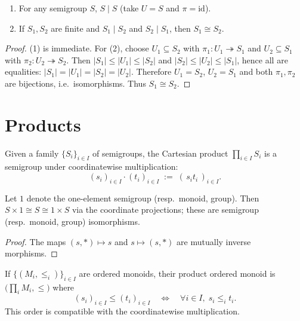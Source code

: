 \begin{lemma}
\label{lem:division-reflexive-antisymmetric-finite}
\leavevmode
\begin{enumerate}
\item For any semigroup \(S\), \(S\mid S\) (take \(U=S\) and \(\pi=\mathrm{id}\)).
\item If \(S_1,S_2\) are finite and \(S_1\mid S_2\) and \(S_2\mid S_1\), then \(S_1\cong S_2\).
\end{enumerate}
\end{lemma}
\begin{proof}
(1) is immediate. For (2), choose \(U_1\subseteq S_2\) with \(\pi_1:U_1\twoheadrightarrow S_1\) and \(U_2\subseteq S_1\) with \(\pi_2:U_2\twoheadrightarrow S_2\). Then
\(|S_1|\le |U_1|\le |S_2|\) and \(|S_2|\le |U_2|\le |S_1|\), hence all are equalities:
\(|S_1|=|U_1|=|S_2|=|U_2|\). Therefore \(U_1=S_2\), \(U_2=S_1\) and both \(\pi_1,\pi_2\) are bijections, i.e.\ isomorphisms. Thus \(S_1\cong S_2\).
\end{proof}


\section {Products}

\begin{definition}
\label{def:semigroup-product}
Given a family \(\{S_i\}_{i\in I}\) of semigroups, the Cartesian product \(\prod_{i\in I} S_i\) is a semigroup under coordinatewise multiplication:
\[
(s_i)_{i\in I}\cdot (t_i)_{i\in I} \;:=\; (\,s_i t_i\,)_{i\in I}.
\]
\end{definition}

\begin{lemma}
\label{lem:one-is-identity-for-product}
Let \(1\) denote the one-element semigroup (resp.\ monoid, group). Then \(S\times 1\cong S\cong 1\times S\) via the coordinate projections; these are semigroup (resp.\ monoid, group) isomorphisms.
\end{lemma}
\begin{proof}
The maps \((s,\ast)\mapsto s\) and \(s\mapsto (s,\ast)\) are mutually inverse morphisms.
\end{proof}

\begin{definition}
\label{def:ordered-monoid-product}
If \(\{(M_i,\le_i)\}_{i\in I}\) are ordered monoids, their product ordered monoid is \(\big(\prod_i M_i,\le\big)\) where
\[
(s_i)_{i\in I}\le (t_i)_{i\in I}\quad\Longleftrightarrow\quad \forall i\in I,\; s_i\le_i t_i.
\]
This order is compatible with the coordinatewise multiplication.
\end{definition}

